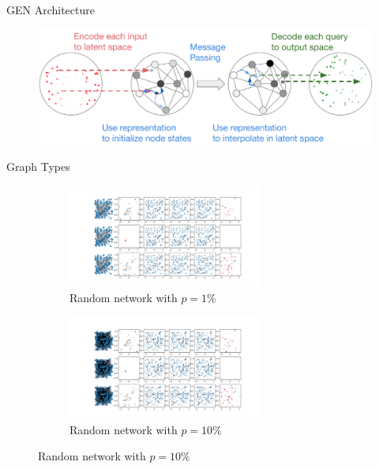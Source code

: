 \documentclass[aspectratio=169]{beamer}
\begin{document}
\begin{frame}{GEN Architecture}
    \begin{figure}[htbp]
        \centering
        \includegraphics[width=\textwidth]{imgs/gen-fig}
    \end{figure}
\end{frame}
\begin{frame}[plain]{Graph Types}
    \begin{figure}[htbp]
        \begin{subfigure}{0.24\textwidth}
            \centering
            \includegraphics[trim={4.8cm 13.2cm 29.3cm 2.4cm},clip,width=0.7\textwidth]{../results/pdfs/rn1-100N-noemb-fixed}
            \caption{Random network with $p=1\%$}
        \end{subfigure}
        \begin{subfigure}{0.24\textwidth}
            \centering
            \includegraphics[trim={4.8cm 13.2cm 29.3cm 2.4cm},clip,width=0.7\textwidth]{../results/pdfs/rn10-100N-noemb-fixed}
            \caption{Random network with $p=10\%$}
        \end{subfigure}

\end{figure}
\end{frame}
\end{document}
